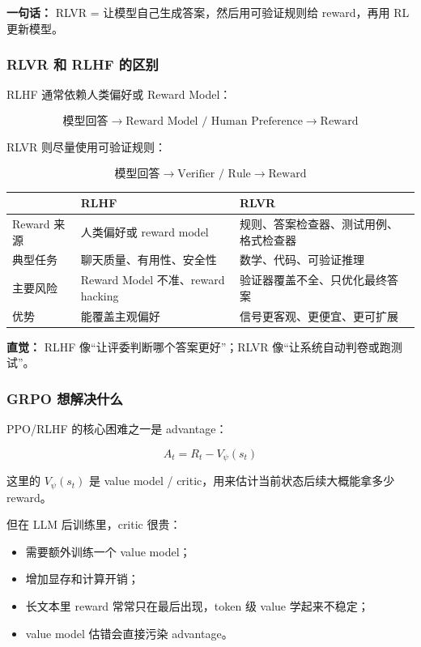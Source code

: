 \begin{summarybox}
\textbf{一句话：} RLVR = 让模型自己生成答案，然后用可验证规则给 reward，再用 RL 更新模型。
\end{summarybox}

\subsubsection{RLVR 和 RLHF 的区别}

RLHF 通常依赖人类偏好或 Reward Model：

\[
\text{模型回答}
\to
\text{Reward Model / Human Preference}
\to
\text{Reward}
\]

RLVR 则尽量使用可验证规则：

\[
\text{模型回答}
\to
\text{Verifier / Rule}
\to
\text{Reward}
\]

\begin{center}
{\small
\begin{tabular}{p{3cm}p{4.8cm}p{4.8cm}}
\hline
 & \textbf{RLHF} & \textbf{RLVR} \\
\hline
Reward 来源 & 人类偏好或 reward model & 规则、答案检查器、测试用例、格式检查器 \\
典型任务 & 聊天质量、有用性、安全性 & 数学、代码、可验证推理 \\
主要风险 & Reward Model 不准、reward hacking & 验证器覆盖不全、只优化最终答案 \\
优势 & 能覆盖主观偏好 & 信号更客观、更便宜、更可扩展 \\
\hline
\end{tabular}
}
\end{center}

\begin{intubox}
\textbf{直觉：} RLHF 像“让评委判断哪个答案更好”；RLVR 像“让系统自动判卷或跑测试”。
\end{intubox}

\subsubsection{GRPO 想解决什么}

PPO/RLHF 的核心困难之一是 advantage：

\[
A_t = R_t - V_\psi(s_t)
\]

这里的 $V_\psi(s_t)$ 是 value model / critic，用来估计当前状态后续大概能拿多少 reward。

但在 LLM 后训练里，critic 很贵：

\begin{itemize}[leftmargin=1.5em]
  \item 需要额外训练一个 value model；
  \item 增加显存和计算开销；
  \item 长文本里 reward 常常只在最后出现，token 级 value 学起来不稳定；
  \item value model 估错会直接污染 advantage。
\end{itemize}


